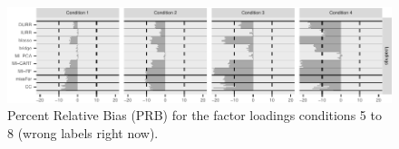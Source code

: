 \begin{figure}
	\includegraphics[width=\textwidth]{../../output/graphs/exp2_CFA_lambda_BPR_58.pdf}
	\caption{Percent Relative Bias (PRB) for the factor loadings conditions 5 to 8 (wrong 
	labels right now).}
\label{fig:exp2fl58}
\end{figure}

\FloatBarrier %

